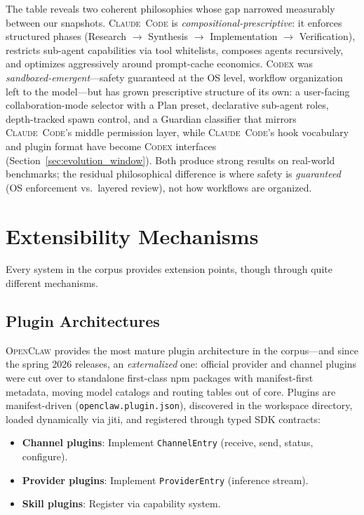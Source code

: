\documentclass[11pt,a4paper]{article}
\newcommand{\clcode}{\textsc{Claude~Code}\xspace}
\newcommand{\cdx}{\textsc{Codex}\xspace}
\newcommand{\ocl}{\textsc{OpenClaw}\xspace}
\begin{document}
The table reveals two coherent philosophies whose gap narrowed measurably between our snapshots.
\clcode{} is \emph{compositional-prescriptive}: it enforces structured phases (Research $\to$ Synthesis $\to$ Implementation $\to$ Verification), restricts sub-agent capabilities via tool whitelists, composes agents recursively, and optimizes aggressively around prompt-cache economics.
\cdx{} was \emph{sandboxed-emergent}---safety guaranteed at the OS level, workflow organization left to the model---but has grown prescriptive structure of its own: a user-facing collaboration-mode selector with a Plan preset, declarative sub-agent roles, depth-tracked spawn control, and a Guardian classifier that mirrors \clcode{}'s middle permission layer, while \clcode{}'s hook vocabulary and plugin format have become \cdx{} interfaces (Section~\ref{sec:evolution_window}).
Both produce strong results on real-world benchmarks; the residual philosophical difference is where safety is \emph{guaranteed} (OS enforcement vs.\ layered review), not how workflows are organized.

\section{Extensibility Mechanisms}
\label{sec:extensibility}

Every system in the corpus provides extension points, though through quite different mechanisms.

\subsection{Plugin Architectures}

\ocl{} provides the most mature plugin architecture in the corpus---and since the spring 2026 releases, an \emph{externalized} one: official provider and channel plugins were cut over to standalone first-class npm packages with manifest-first metadata, moving model catalogs and routing tables out of core.
Plugins are manifest-driven (\texttt{openclaw.plugin.json}), discovered in the workspace directory, loaded dynamically via jiti, and registered through typed SDK contracts:

\begin{itemize}[itemsep=1pt]
  \item \textbf{Channel plugins}: Implement \texttt{ChannelEntry} (receive, send, status, configure).
  \item \textbf{Provider plugins}: Implement \texttt{ProviderEntry} (inference stream).
  \item \textbf{Skill plugins}: Register via capability system.
\end{itemize}
\end{document}
